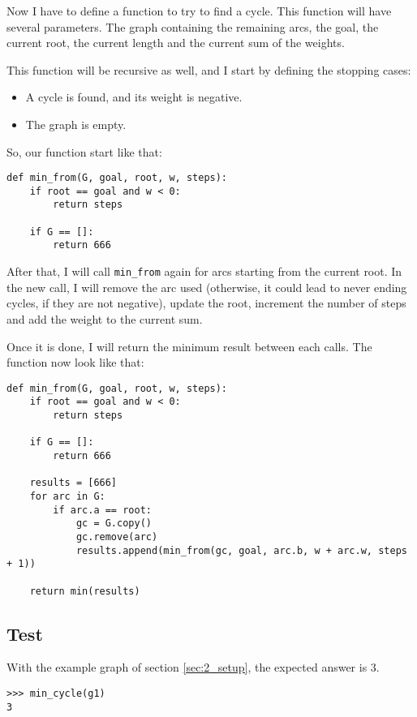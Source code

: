        Now I have to define a function to try to find a cycle. This function will have several parameters. The graph containing the remaining arcs, the goal, the current root, the current length and the current sum of the weights.

        This function will be recursive as well, and I start by defining the stopping cases:
        \begin{itemize}
            \item A cycle is found, and its weight is negative. 
            \item The graph is empty.
        \end{itemize}

        So, our function start like that:
        \begin{lstlisting}
def min_from(G, goal, root, w, steps):
    if root == goal and w < 0:
        return steps

    if G == []:
        return 666
        \end{lstlisting}

        After that, I will call \verb|min_from| again for arcs starting from the current root. In the new call, I will remove the arc used (otherwise, it could lead to never ending cycles, if they are not negative), update the root, increment the number of steps and add the weight to the current sum.

        Once it is done, I will return the minimum result between each calls. The function now look like that:
        \begin{lstlisting}
def min_from(G, goal, root, w, steps):
    if root == goal and w < 0:
        return steps

    if G == []:
        return 666

    results = [666]
    for arc in G:
        if arc.a == root:
            gc = G.copy()
            gc.remove(arc)
            results.append(min_from(gc, goal, arc.b, w + arc.w, steps + 1))

    return min(results)
        \end{lstlisting}

    \subsection{Test}
        With the example graph of section \ref{sec:2_setup}, the expected answer is $3$.
        \begin{lstlisting}
>>> min_cycle(g1)
3
        \end{lstlisting}

